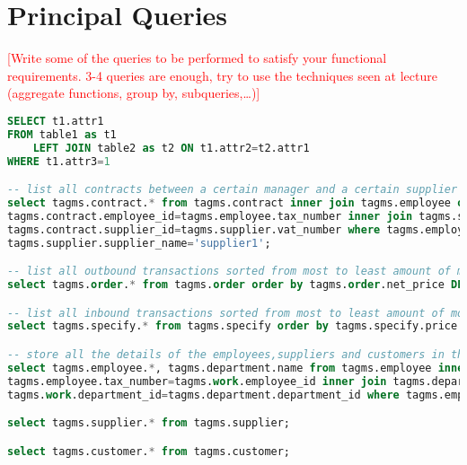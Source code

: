 \section{Principal Queries}
\textcolor{red}{[Write some of the queries to be performed to satisfy your functional requirements. 3-4 queries are enough, try to use the techniques seen at lecture (aggregate functions, group by, subqueries,…)]}

\begin{lstlisting}[language=SQL,
keywordstyle=\color{blue},
stringstyle=\color{mauve},
showstringspaces=false,
basicstyle=\ttfamily\footnotesize]
SELECT t1.attr1
FROM table1 as t1
    LEFT JOIN table2 as t2 ON t1.attr2=t2.attr1 
WHERE t1.attr3=1

-- list all contracts between a certain manager and a certain supplier
select tagms.contract.* from tagms.contract inner join tagms.employee on
tagms.contract.employee_id=tagms.employee.tax_number inner join tagms.supplier on
tagms.contract.supplier_id=tagms.supplier.vat_number where tagms.employee.first_name='Luca' and
tagms.supplier.supplier_name='supplier1';

-- list all outbound transactions sorted from most to least amount of money:
select tagms.order.* from tagms.order order by tagms.order.net_price DESC;

-- list all inbound transactions sorted from most to least amount of money:
select tagms.specify.* from tagms.specify order by tagms.specify.price DESC;

-- store all the details of the employees,suppliers and customers in the organization:
select tagms.employee.*, tagms.department.name from tagms.employee inner join tagms.work on 
tagms.employee.tax_number=tagms.work.employee_id inner join tagms.department on 
tagms.work.department_id=tagms.department.department_id where tagms.employee.still_working=TRUE;

select tagms.supplier.* from tagms.supplier;

select tagms.customer.* from tagms.customer;

\end{lstlisting}

